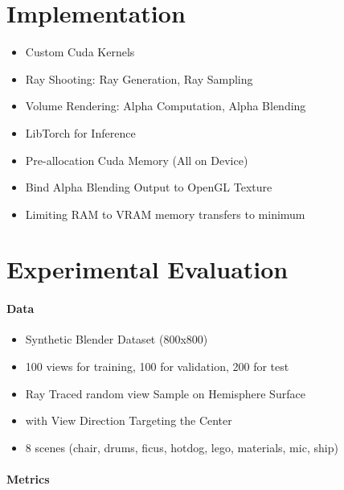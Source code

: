 \section{Implementation}

\begin{itemize}
    \item Custom Cuda Kernels 
    \item Ray Shooting: Ray Generation, Ray Sampling
    \item Volume Rendering: Alpha Computation, Alpha Blending
    \item LibTorch for Inference
    \item Pre-allocation Cuda Memory (All on Device)
    \item Bind Alpha Blending Output to OpenGL Texture
    \item Limiting RAM to VRAM memory transfers to minimum
\end{itemize}

\section{Experimental Evaluation}

\paragraph{Data}

\begin{itemize}
    \item Synthetic Blender Dataset (800x800)
    \item 100 views for training, 100 for validation, 200 for test
    \item Ray Traced random view Sample on Hemisphere Surface
    \item with View Direction Targeting the Center
    \item 8 scenes (chair, drums, ficus, hotdog, lego, materials, mic, ship)
\end{itemize}

\paragraph{Metrics}

